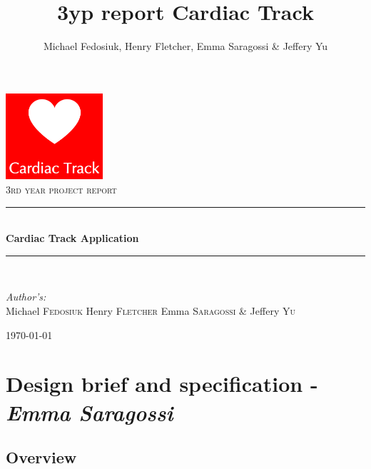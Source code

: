 \documentclass[11pt]{article}
\author{Michael Fedosiuk, Henry Fletcher, Emma Saragossi & Jeffery Yu}
\title{3yp report Cardiac Track}
\newcommand{\HRule}{\rule{\linewidth}{0.5mm}}
\begin{document}
\begin{titlepage}
\begin{center}

\includegraphics[width=0.27\textwidth]{titleimg.png}~\\[1cm]

\textsc{\Large 3rd year project report}\\[0.5cm]

\HRule \\[0.4cm]
{ \huge \bfseries Cardiac Track Application \\[0.4cm] }

\HRule \\[1.5cm]

\begin{minipage}{0.8\textwidth}
\begin{flushleft} \large
\emph{Author's:}\\
Michael \textsc{Fedosiuk} Henry \textsc{Fletcher} Emma \textsc{Saragossi} \& Jeffery \textsc{Yu}
\\
\end{flushleft}
\end{minipage}

\vfill

{\large \today}

\end{center}
\end{titlepage}

\tableofcontents

\section{Design brief and specification - \textit{Emma Saragossi}}
\subsection{Overview}
\end{document}
